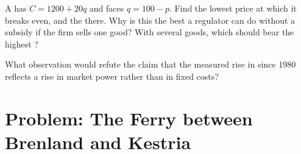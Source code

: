 \begin{exercise}[$\star\star\star$]\label{exo:b1:monopoly-pricing:ramsey}
A  has $C = 1200 + 20q$ and faces $q = 100 - p$. Find the lowest
price at which it breaks even, and the  there. Why is this
the best a regulator can do without a subsidy if the firm sells one good?
With several goods, which should bear the highest ?
\end{exercise}

\begin{exercise}[$\star\star\star$]\label{exo:b1:monopoly-pricing:refute}
What observation would refute the claim that the measured rise in 
since 1980 reflects a rise in market power rather than in fixed costs?
\end{exercise}

\section{Problem: The Ferry between Brenland and Kestria}\label{sec:b1:monopoly-pricing:problem}

